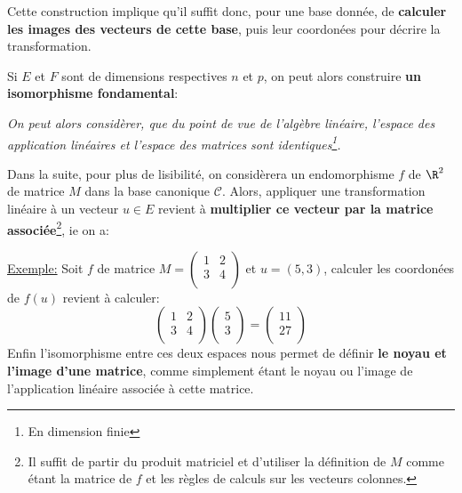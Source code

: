 Cette construction implique qu'il suffit donc, pour une base donnée, de \textbf{calculer les images des vecteurs de cette base}, puis leur coordonées pour décrire la transformation.\<

Si \(E\) et \(F\) sont de dimensions respectives \(n\) et \(p\), on peut alors construire \textbf{un isomorphisme fondamental}:
\newcommand{\widesim}[2][1.5]{
  \mathrel{\overset{#2}{\scalebox{#1}[1]{$\sim$}}}
}
\customBox{width=7cm}{
   \(
      \text{Mat}_{\mathscr{B, C}} : \mathcal{L}(E, F) \xlongrightarrow{\widesim{}} \mathcal{M}_{n, p}(\K) 
   \)
}

\begin{center}
   \textit{On peut alors considèrer, que du point de vue de l'algèbre linéaire, l'espace des application linéaires et l'espace des matrices sont identiques\footnote[1]{En dimension finie}.}
\end{center}

Dans la suite, pour plus de lisibilité, on considèrera un endomorphisme \(f\) de \(\R^2\) de matrice \(M\) dans la base canonique \(\mathscr{C}\).
Alors, appliquer une transformation linéaire à un vecteur \(u \in E\) revient à \textbf{multiplier ce vecteur par la matrice associée}\footnote[2]{Il suffit de partir du produit matriciel et d'utiliser la définition de \(M\) comme étant la matrice de \(f\) et les règles de calculs sur les vecteurs colonnes.}, ie on a:

\underline{Exemple:} Soit \(f\) de matrice 
\(M = \begin{pmatrix}
   1 & 2\\
   3 & 4\\
\end{pmatrix}\) 
et \(u = (5, 3)\), calculer les coordonées de \(f(u)\) revient à calculer:
\[
   \begin{pmatrix}
      1 & 2\\
      3 & 4\\
   \end{pmatrix}
   \begin{pmatrix}
      5 \\
      3 \\
   \end{pmatrix} =
   \begin{pmatrix}
      11 \\
      27 \\
   \end{pmatrix} 
\]
Enfin l'isomorphisme entre ces deux espaces nous permet de définir \textbf{le noyau et l'image d'une matrice}, comme simplement étant le noyau ou l'image de l'application linéaire associée à cette matrice.

